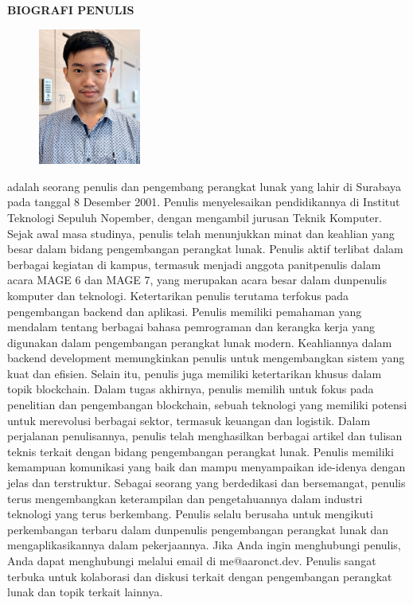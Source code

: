 \begin{center}
  \Large
  \textbf{BIOGRAFI PENULIS}
\end{center}


\vspace{2ex}

\begin{figure}
  \centering
  \vspace{-3ex}
  \includegraphics[width=0.3\textwidth]{gambar/me.jpg}
  \vspace{-4ex}
\end{figure}

\name{} adalah seorang penulis dan pengembang perangkat lunak yang lahir di Surabaya pada tanggal 8 Desember 2001. Penulis menyelesaikan pendidikannya di Institut Teknologi Sepuluh Nopember, dengan mengambil jurusan Teknik Komputer.
Sejak awal masa studinya, penulis telah menunjukkan minat dan keahlian yang besar dalam bidang pengembangan perangkat lunak. Penulis aktif terlibat dalam berbagai kegiatan di kampus, termasuk menjadi anggota panitpenulis dalam acara MAGE 6 dan MAGE 7, yang merupakan acara besar dalam dunpenulis komputer dan teknologi.
Ketertarikan penulis terutama terfokus pada pengembangan backend dan aplikasi. Penulis memiliki pemahaman yang mendalam tentang berbagai bahasa pemrograman dan kerangka kerja yang digunakan dalam pengembangan perangkat lunak modern. Keahliannya dalam backend development memungkinkan penulis untuk mengembangkan sistem yang kuat dan efisien.
Selain itu, penulis juga memiliki ketertarikan khusus dalam topik blockchain. Dalam tugas akhirnya, penulis memilih untuk fokus pada penelitian dan pengembangan blockchain, sebuah teknologi yang memiliki potensi untuk merevolusi berbagai sektor, termasuk keuangan dan logistik.
Dalam perjalanan penulisannya, penulis telah menghasilkan berbagai artikel dan tulisan teknis terkait dengan bidang pengembangan perangkat lunak. Penulis memiliki kemampuan komunikasi yang baik dan mampu menyampaikan ide-idenya dengan jelas dan terstruktur.
Sebagai seorang yang berdedikasi dan bersemangat, penulis terus mengembangkan keterampilan dan pengetahuannya dalam industri teknologi yang terus berkembang. Penulis selalu berusaha untuk mengikuti perkembangan terbaru dalam dunpenulis pengembangan perangkat lunak dan mengaplikasikannya dalam pekerjaannya.
Jika Anda ingin menghubungi penulis, Anda dapat menghubungi melalui email di me@aaronct.dev. Penulis sangat terbuka untuk kolaborasi dan diskusi terkait dengan pengembangan perangkat lunak dan topik terkait lainnya.

